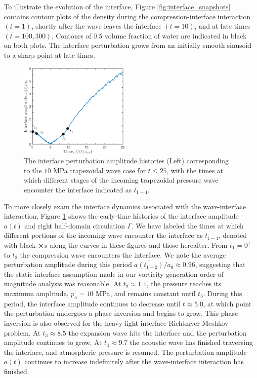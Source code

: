 %
To illustrate the evolution of the interface, Figure
\ref{fig:interface_snapshots} contains contour plots of the density
during the compression-interface interaction $(t=1)$, shortly after
the wave leaves the interface $(t=10)$, and at late times
$(t=100, 300)$. Contours of 0.5 volume fraction of water are indicated
in black on both plots. The interface perturbation grows from an
initially smooth sinusoid to a sharp point at late times.
%
\begin{figure}[h] 
  \centering
  \includegraphics[width=0.48\textwidth]{./figs/lung_figs/trapz10_intf_schematic}
  \caption[The interface perturbation amplitude histories]{The
    interface perturbation amplitude histories (Left) corresponding to
    the $10$ MPa trapezoidal wave case for $t\leq25$, with the times
    at which different stages of the incoming trapezoidal pressure
    wave encounter the interface indicated as $t_{1-4}$.
  }
  \label{fig:trapz10_circ_interface}
\end{figure}
%
To more closely exam the interface dynamics associated with the
wave-interface interaction, Figure \ref{fig:trapz10_circ_interface}
shows the early-time histories of the interface amplitude $a(t)$ and
right half-domain circulation $\Gamma$. We have labeled the times at
which different portions of the incoming wave encounter the interface
as $t_{1-4}$, denoted with black $\boldsymbol{\times}$s along the curves in
these figures and those hereafter. From $t_1=0^+$ to $t_2$ the
compression wave encounters the interface. We note the average
perturbation amplitude during this period
$\overline{a(t_{1-2})}/a_0\approx0.96$, suggesting that the static
interface assumption made in our vorticity generation order of
magnitude analysis was reasonable. At $t_2\approx1.1$, the pressure
reaches its maximum amplitude, $p_a=10$ MPa, and remains constant
until $t_3$. During this period, the interface amplitude continues to
decrease until $t\approx 5.0$, at which point the perturbation
undergoes a phase inversion and begins to grow. This phase inversion
is also observed for the heavy-light interface Richtmyer-Meshkov
problem. At $t_3\approx8.5$ the expansion wave hits the interface and
the perturbation amplitude continues to grow. At $t_4\approx9.7$ the
acoustic wave has finished traversing the interface, and atmospheric
pressure is resumed. The perturbation amplitude $a(t)$ continues to
increase indefinitely after the wave-interface interaction has
finished.
%
%
